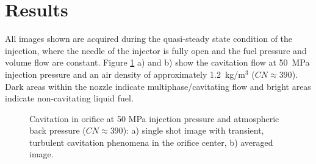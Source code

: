 \documentclass[letterpaper,twocolumn,10pt]{ilass}
\begin{document}
\section*{Results}

All images shown are acquired during the quasi-steady state condition of the injection, where
the needle of the injector is fully open and the fuel pressure and volume flow are
constant. Figure \ref{fig4} a) and b) show the cavitation flow at 50~MPa injection
pressure and an air density of approximately 1.2~kg/m$^3$ ($CN \approx 390$). Dark areas within the nozzle
indicate multiphase/cavitating flow and bright areas indicate non-cavitating liquid fuel.
%
\begin{figure}[h]
\begin{center}
\end{center}
\vspace*{-10mm}
\caption{Cavitation in orifice at 50 MPa injection pressure and atmospheric back pressure
         ($CN \approx 390$): a) single shot image with transient, turbulent cavitation
				 phenomena in the orifice center, b) averaged image.}
\label{fig4} 
\end{figure}
\end{document}
